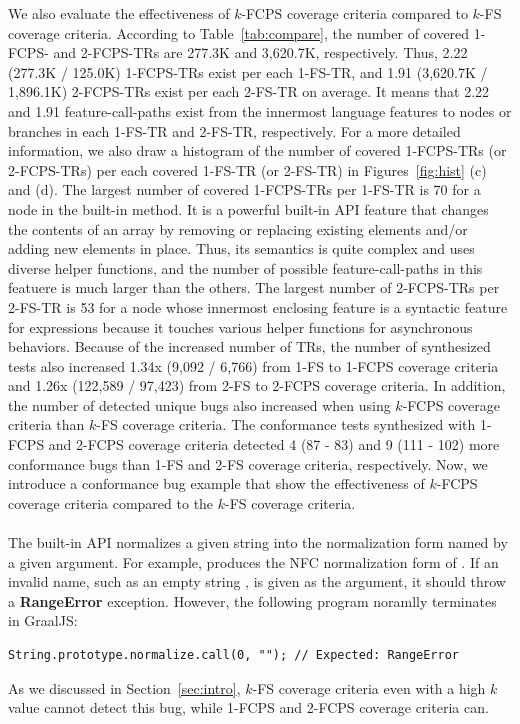 We also evaluate the effectiveness of $k$-FCPS coverage criteria compared to $k$-FS
coverage criteria.
%
According to Table~\ref{tab:compare}, the number of covered 1-FCPS- and
2-FCPS-TRs are 277.3K and 3,620.7K, respectively.
%
Thus, 2.22 (277.3K / 125.0K) 1-FCPS-TRs exist per each 1-FS-TR, and 1.91
(3,620.7K / 1,896.1K) 2-FCPS-TRs exist per each 2-FS-TR on average.
%
It means that 2.22 and 1.91 feature-call-paths exist from the innermost
language features to nodes or branches in each 1-FS-TR and 2-FS-TR,
respectively.
%
For a more detailed information, we also draw a histogram of the number of
covered 1-FCPS-TRs (or 2-FCPS-TRs) per each covered 1-FS-TR (or 2-FS-TR) in
Figures~\ref{fig:hist} (c) and (d).
%
The largest number of covered 1-FCPS-TRs per 1-FS-TR is 70 for a node
in the  built-in method.
%
It is a powerful built-in API feature that changes the contents of an array by
removing or replacing existing elements and/or adding new elements in place.
%
Thus, its semantics is quite complex and uses diverse helper functions, and the
number of possible feature-call-paths in this featuere is much larger than
the others.
%
The largest number of 2-FCPS-TRs per 2-FS-TR is 53 for a node whose
innermost enclosing feature is a syntactic feature for  expressions
because it touches various helper functions for asynchronous behaviors.
%
Because of the increased number of TRs, the number of synthesized tests also
increased 1.34x (9,092 / 6,766) from 1-FS to 1-FCPS coverage criteria and 1.26x
(122,589 / 97,423) from 2-FS to 2-FCPS coverage criteria.
%
In addition, the number of detected unique bugs also increased when using
$k$-FCPS coverage criteria than $k$-FS coverage criteria.
%
The conformance tests synthesized with 1-FCPS and 2-FCPS coverage criteria
detected 4 (87 - 83) and 9 (111 - 102) more conformance bugs than
1-FS and 2-FS coverage criteria, respectively.
%
Now, we introduce a conformance bug example that show the effectiveness of $k$-FCPS
coverage criteria compared to the $k$-FS coverage criteria.


\paragraph{\textbf{}}
%
The  built-in API normalizes a given string
into the normalization form named by a given argument.
%
For example,  produces the NFC normalization form
of .
%
If an invalid name, such as an empty string , is given as the
argument, it should throw a \textbf{RangeError} exception.
%
However, the following program noramlly terminates in GraalJS:
\begin{lstlisting}[style=JS, basicstyle=\footnotesize\ttfamily]
    String.prototype.normalize.call(0, ""); // Expected: RangeError
\end{lstlisting}
As we discussed in Section~\ref{sec:intro},
$k$-FS coverage criteria even with a high $k$ value cannot detect this bug,
while 1-FCPS and 2-FCPS coverage criteria can.


